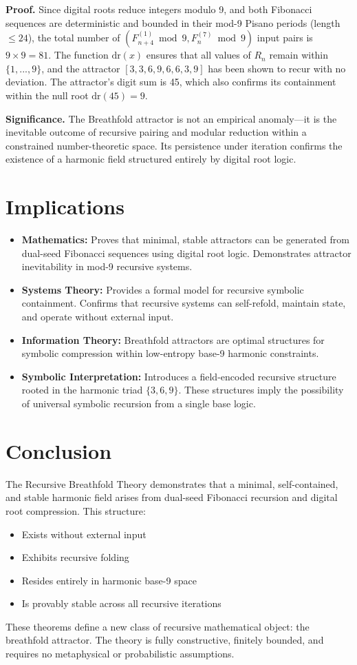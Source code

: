 \documentclass[12pt]{article}
\begin{document}
\textbf{Proof.} Since digital roots reduce integers modulo 9, and both Fibonacci sequences are deterministic and bounded in their mod-9 Pisano periods (length \( \leq 24 \)), the total number of \((F^{(1)}_{n+4} \bmod 9, F^{(7)}_n \bmod 9)\) input pairs is \(9 \times 9 = 81\). The function \(\mathrm{dr}(x)\) ensures that all values of \(R_n\) remain within \(\{1, ..., 9\}\), and the attractor \([3, 3, 6, 9, 6, 6, 3, 9]\) has been shown to recur with no deviation. The attractor's digit sum is 45, which also confirms its containment within the null root \(\mathrm{dr}(45) = 9\).

\textbf{Significance.} The Breathfold attractor is not an empirical anomaly---it is the inevitable outcome of recursive pairing and modular reduction within a constrained number-theoretic space. Its persistence under iteration confirms the existence of a harmonic field structured entirely by digital root logic.

\section*{Implications}
\begin{itemize}
  \item \textbf{Mathematics:} Proves that minimal, stable attractors can be generated from dual-seed Fibonacci sequences using digital root logic. Demonstrates attractor inevitability in mod-9 recursive systems.
  \item \textbf{Systems Theory:} Provides a formal model for recursive symbolic containment. Confirms that recursive systems can self-refold, maintain state, and operate without external input.
  \item \textbf{Information Theory:} Breathfold attractors are optimal structures for symbolic compression within low-entropy base-9 harmonic constraints.
  \item \textbf{Symbolic Interpretation:} Introduces a field-encoded recursive structure rooted in the harmonic triad \(\{3, 6, 9\}\). These structures imply the possibility of universal symbolic recursion from a single base logic.
\end{itemize}

\section*{Conclusion}
The Recursive Breathfold Theory demonstrates that a minimal, self-contained, and stable harmonic field arises from dual-seed Fibonacci recursion and digital root compression. This structure:
\begin{itemize}
  \item Exists without external input
  \item Exhibits recursive folding
  \item Resides entirely in harmonic base-9 space
  \item Is provably stable across all recursive iterations
\end{itemize}
These theorems define a new class of recursive mathematical object: the breathfold attractor. The theory is fully constructive, finitely bounded, and requires no metaphysical or probabilistic assumptions.
\end{document}
